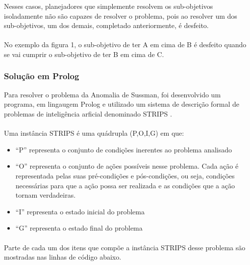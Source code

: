 \documentclass[12pt,titlepage]{article}
\begin{document}
Nesses casos, planejadores que simplemente resolvem os sub-objetivos isoladamente não são capazes de resolver o problema, pois ao resolver um dos sub-objetivos, um dos demais, completado anteriormente, é desfeito.
\paragraph{}

No exemplo da figura 1, o sub-objetivo de ter A em cima de B é desfeito quando se vai cumprir o sub-objetivo de ter B em cima de C.

\subsubsection{Solução em Prolog}

Para resolver o problema da Anomalia de Sussman, foi desenvolvido um programa, em lingaugem Prolog \cite{prolog} e utilizado um sistema de descrição formal de problemas de inteligência arficial denominado STRIPS \cite{intart}.
\paragraph{}

	Uma instância STRIPS é uma quádrupla (P,O,I,G) em que:

  \begin{itemize}
    \item 		“P” representa o conjunto de condições inerentes ao problema analisado
    \item 		“O” representa o conjunto de ações possíveis nesse problema. Cada ação é representada pelas suas pré-condições e pós-condições, ou seja, condições necessárias para que a ação possa ser realizada e as condições que a ação tornam verdadeiras.
    \item 		“I” representa o estado inicial do problema
    \item     “G” representa o estado final do problema

  \end{itemize}
	\paragraph{}

  Parte de cada um dos itens que compõe a instância STRIPS desse problema são mostradas nas linhas de código abaixo.
\end{document}
